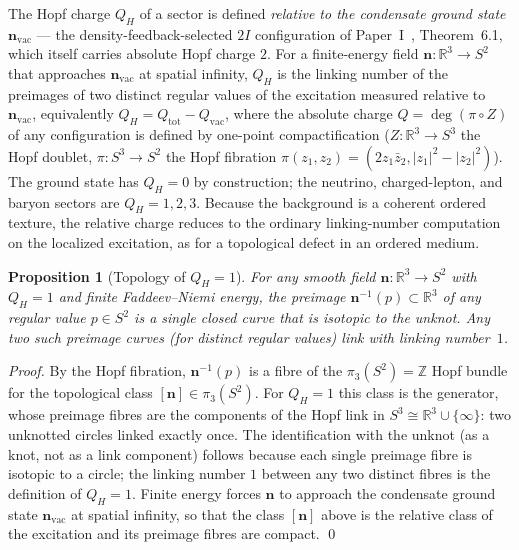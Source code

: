 \documentclass[11pt,a4paper]{article}
\newtheorem{proposition}[theorem]{Proposition}
\theoremstyle{definition}\newtheorem{definition}[theorem]{Definition}
\theoremstyle{remark}
\newcommand{\QH}{Q_H}
\begin{document}
The Hopf charge $\QH$ of a sector is defined \emph{relative to the
condensate ground state} $\mathbf{n}_{\mathrm{vac}}$ --- the
density-feedback-selected $2I$ configuration of
Paper~I~\cite{Paper1}, Theorem~6.1,%
which itself carries absolute Hopf charge $2$.  For a finite-energy field
$\mathbf{n}:\mathbb{R}^3\to S^2$ that approaches $\mathbf{n}_{\mathrm{vac}}$
at spatial infinity, $\QH$ is the linking number of the preimages of two
distinct regular values of the excitation measured relative to
$\mathbf{n}_{\mathrm{vac}}$, equivalently
$\QH=Q_{\mathrm{tot}}-Q_{\mathrm{vac}}$, where the absolute charge
$Q=\deg(\pi\circ Z)$ of any configuration is defined by one-point
compactification ($Z:\mathbb{R}^3\to S^3$ the Hopf doublet,
$\pi:S^3\to S^2$ the Hopf fibration
$\pi(z_1,z_2)=(2z_1\bar z_2,|z_1|^2-|z_2|^2)$).  The ground state has
$\QH=0$ by construction; the neutrino, charged-lepton, and baryon sectors
are $\QH=1,2,3$.  Because the background is a coherent ordered texture, the
relative charge reduces to the ordinary linking-number computation on the
localized excitation, as for a topological defect in an ordered medium.

\begin{proposition}[Topology of $\QH=1$]
\label{P17:prop:qh1_unknot}
For any smooth field $\mathbf{n}:\mathbb{R}^3\to S^2$ with $\QH=1$
and finite Faddeev--Niemi energy, the preimage
$\mathbf{n}^{-1}(p)\subset\mathbb{R}^3$ of any regular value $p\in S^2$
is a single closed curve that is isotopic to the unknot. Any two such
preimage curves (for distinct regular values) link with linking
number~$1$.
\end{proposition}

\begin{proof}
By the Hopf fibration, $\mathbf{n}^{-1}(p)$ is a fibre of the
$\pi_3(S^2)=\mathbb{Z}$ Hopf bundle for the topological class
$[\mathbf{n}]\in\pi_3(S^2)$. For $\QH=1$ this class is the generator,
whose preimage fibres are the components of the Hopf link in
$S^3\cong\mathbb{R}^3\cup\{\infty\}$: two unknotted circles linked
exactly once. The identification with the unknot (as a knot, not as a
link component) follows because each single preimage fibre is
isotopic to a circle; the linking number $1$ between any two distinct
fibres is the definition of $\QH=1$. Finite energy forces $\mathbf{n}$
to approach the condensate ground state $\mathbf{n}_{\mathrm{vac}}$ at
spatial infinity, so that the class $[\mathbf{n}]$ above is the relative
class of the excitation and its preimage fibres are compact.
\qed
\end{proof}
\end{document}

